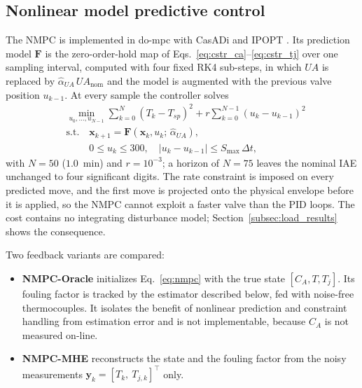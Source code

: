 \subsection{Nonlinear model predictive control}
\label{subsec:nmpc}
The NMPC is implemented in do-mpc with CasADi and IPOPT \cite{fiedler2023dompc, rawlings2020model}. Its prediction model $\mathbf{F}$ is the zero-order-hold map of Eqs.~\eqref{eq:cstr_ca}--\eqref{eq:cstr_tj} over one sampling interval, computed with four fixed RK4 sub-steps, in which $UA$ is replaced by $\hat\alpha_{UA}\,UA_{\text{nom}}$ and the model is augmented with the previous valve position $u_{k-1}$. At every sample the controller solves
\begin{align}
    &\min_{u_0,\dots,u_{N-1}} \sum_{k=0}^{N} \left(T_k - T_{sp}\right)^2 + r\sum_{k=0}^{N-1}(u_k - u_{k-1})^2 \nonumber \\
    &\text{s.t.} \quad \mathbf{x}_{k+1} = \mathbf{F}(\mathbf{x}_k, u_k;\, \hat\alpha_{UA}), \nonumber \\
    &\phantom{\text{s.t.}} \quad 0 \le u_k \le 300, \quad |u_k - u_{k-1}| \le S_{\max}\,\Delta t,
    \label{eq:nmpc}
\end{align}
with $N = 50$ ($1.0$~min) and $r = 10^{-3}$; a horizon of $N = 75$ leaves the nominal IAE unchanged to four significant digits. The rate constraint is imposed on every predicted move, and the first move is projected onto the physical envelope before it is applied, so the NMPC cannot exploit a faster valve than the PID loops. The cost contains no integrating disturbance model; Section~\ref{subsec:load_results} shows the consequence.

Two feedback variants are compared:
\begin{itemize}
    \item \textbf{NMPC-Oracle} initializes Eq.~\eqref{eq:nmpc} with the true state $[C_A, T, T_j]$. Its fouling factor is tracked by the estimator described below, fed with noise-free thermocouples. It isolates the benefit of nonlinear prediction and constraint handling from estimation error and is not implementable, because $C_A$ is not measured on-line.
    \item \textbf{NMPC-MHE} reconstructs the state and the fouling factor from the noisy measurements $\mathbf{y}_k = [T_k,\ T_{j,k}]^\top$ only.
\end{itemize}

